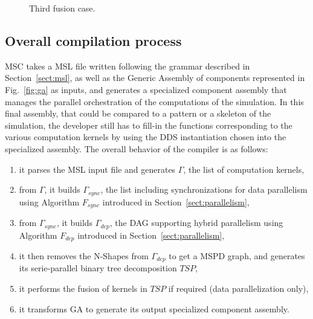 \begin{figure}[h!]
\begin{center}
\caption{Third fusion case.}
\label{fig:fus3}
\end{center}
\end{figure}

\subsection{Overall compilation process}
\label{sect:ovcompil}

MSC takes a MSL file written following the grammar described in Section~\ref{sect:msl}, as well as the Generic Assembly of components represented in Fig.~\ref{fig:ga} as inputs, and generates a specialized component assembly that manages the parallel orchestration of the computations of the simulation. In this final assembly, that could be compared to a pattern or a skeleton of the simulation, the developer still has to fill-in the functions corresponding to the various computation kernels by using the DDS instantiation chosen into the specialized assembly.
The overall behavior of the compiler is as follows: %
\begin{enumerate}
 \item it parses the MSL input file and generates $\Gamma$, the list of computation kernels,
 \item from $\Gamma$, it builds $\Gamma_{sync}$, the list including synchronizations for data parallelism using Algorithm $F_{sync}$ introduced in Section~\ref{sect:parallelism},
 \item from $\Gamma_{sync}$, it builds $\Gamma_{dep}$, the DAG supporting hybrid parallelism using Algorithm $F_{dep}$ introduced in Section~\ref{sect:parallelism},
 \item it then removes the N-Shapes from $\Gamma_{dep}$ to get a MSPD graph, and generates its serie-parallel binary tree decomposition $TSP$,
 \item it performs the fusion of kernels in $TSP$ if required (data parallelization only),
 \item it transforms GA to generate its output specialized component assembly.
\end{enumerate}

